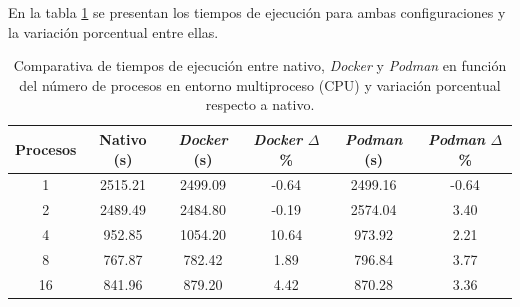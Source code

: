 En la tabla \ref{tab:multi-node_ubuntu_container_vs_native} se presentan los tiempos de ejecución para ambas configuraciones y la variación porcentual entre ellas.

\begin{table}[ht]
    \centering
    \small
    \setlength{\tabcolsep}{4pt}
    \renewcommand{\arraystretch}{1.1}
    \begin{tabular}{|c|c|c|c|c|c|}
        \hline
        \textbf{Procesos} & \textbf{Nativo (s)} & \textbf{\textit{Docker} (s)} & \textbf{\textit{Docker} $\Delta$\%} & \textbf{\textit{Podman} (s)} & \textbf{\textit{Podman} $\Delta$\%} \\
        \hline
        1                 & 2515.21             & 2499.09                      & -0.64                               & 2499.16                      & -0.64                               \\
        2                 & 2489.49             & 2484.80                      & -0.19                               & 2574.04                      & 3.40                                \\
        4                 & 952.85              & 1054.20                      & 10.64                               & 973.92                       & 2.21                                \\
        8                 & 767.87              & 782.42                       & 1.89                                & 796.84                       & 3.77                                \\
        16                & 841.96              & 879.20                       & 4.42                                & 870.28                       & 3.36                                \\
        \hline
    \end{tabular}
    \caption{Comparativa de tiempos de ejecución entre nativo, \textit{Docker} y \textit{Podman} en función del número de procesos en entorno multiproceso (CPU) y variación porcentual respecto a nativo.}
    \label{tab:multi-node_ubuntu_container_vs_native}
\end{table}

